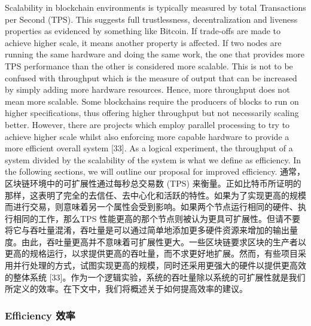 \documentclass{ctexart}
\begin{document}
Scalability in blockchain environments is typically measured by total Transactions per Second (TPS). This suggests full trustlessness, decentralization and liveness properties as evidenced by something like Bitcoin. If trade-offs are made to achieve higher scale, it means another property is affected. If two nodes are running the same hardware and doing the same work, the one that provides more TPS performance than the other is considered more scalable. This is not to be confused with throughput which is the measure of output that can be increased by simply adding more hardware resources. Hence, more throughput does not mean more scalable. Some blockchains require the producers of blocks to run on higher specifications, thus offering higher throughput but not necessarily scaling better. However, there are projects which employ parallel processing to try to achieve higher scale whilst also enforcing more capable hardware to provide a more efficient overall system [33]. As a logical experiment, the throughput of a system divided by the scalability of the system is what we define as efficiency. In the following sections, we will outline our proposal for improved efficiency. 通常，区块链环境中的可扩展性通过每秒总交易数 (TPS) 来衡量。正如比特币所证明的那样，这表明了完全的去信任、去中心化和活跃的特性。如果为了实现更高的规模而进行交易，则意味着另一个属性会受到影响。如果两个节点运行相同的硬件、执行相同的工作，那么TPS 性能更高的那个节点则被认为更具可扩展性。但请不要将它与吞吐量混淆，吞吐量是可以通过简单地添加更多硬件资源来增加的输出量度。由此，吞吐量更高并不意味着可扩展性更大。一些区块链要求区块的生产者以更高的规格运行，以求提供更高的吞吐量，而不求更好地扩展。然而，有些项目采用并行处理的方式，试图实现更高的规模，同时还采用更强大的硬件以提供更高效的整体系统 [33]。作为一个逻辑实验，系统的吞吐量除以系统的可扩展性就是我们所定义的效率。在下文中，我们将概述关于如何提高效率的建议。

\subsubsection{Efficiency 效率}
\end{document}
